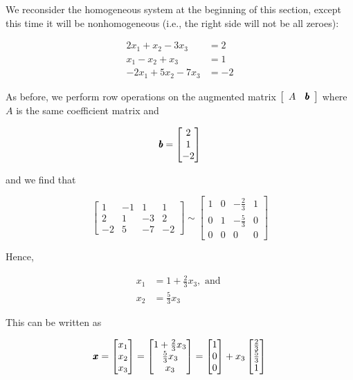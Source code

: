 \begin{example} We reconsider the homogeneous system at the beginning of this section, except this time it will be nonhomogeneous (i.e., the right side will not be all zeroes):

\[
\begin{aligned}
2 x_1 + x_2 - 3 x_3 & = 2 \\
x_1 - x_2 + x_3 & = 1 \\
-2 x_1 + 5 x_2 - 7 x_3 & = -2
\end{aligned}
\]

As before, we perform row operations on the augmented matrix \(\left[\begin{array}{cc} A & \pmb{b} \end{array}\right]\) where \( A \) is the same coefficient matrix and

\[
\pmb{b} = \begin{bmatrix}
2 \\
1 \\
-2
\end{bmatrix}
\]

and we find that

\[
\left[\begin{array}{cccc}
1 & -1 & 1 & 1 \\
2 & 1 & -3 & 2 \\
-2 & 5 & -7 & -2
\end{array}\right]
\sim
\left[\begin{array}{cccc}
1 & 0 & -\frac{2}{3} & 1 \\
0 & 1 & -\frac{5}{3} & 0 \\
0 & 0 & 0 & 0
\end{array}\right]
\]

Hence,

\[
\begin{aligned}
x_1 &= 1 + \frac{2}{3} x_3, \text{ and } \\
x_2 &= \frac{5}{3} x_3
\end{aligned}
\]

This can be written as

\[
\pmb{x} = \begin{bmatrix}
x_1 \\
x_2 \\
x_3
\end{bmatrix} =
\begin{bmatrix}
1 + \frac{2}{3} x_3 \\
\frac{5}{3} x_3 \\
x_3
\end{bmatrix}
= \begin{bmatrix}
1 \\
0 \\
0
\end{bmatrix} + x_3 \begin{bmatrix}
\frac{2}{3} \\
\frac{5}{3} \\
1
\end{bmatrix}
\]


\end{example}
